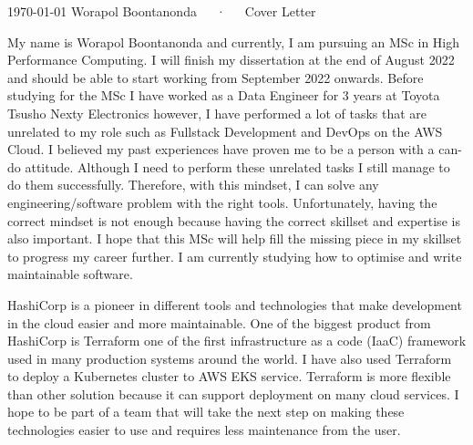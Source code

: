 \documentclass[11pt, a4paper]{awesome-cv}
\begin{document}
\makecvheader[R]

\makecvfooter
  {\today}
  {Worapol Boontanonda~~~·~~~Cover Letter}
  {}

\makelettertitle

\begin{cvletter}

My name is Worapol Boontanonda and currently, I am pursuing an MSc in High Performance Computing.
I will finish my dissertation at the end of August 2022 and should be able to start working from
September 2022 onwards.
Before studying for the MSc I have worked as a Data Engineer for 3 years at Toyota Tsusho Nexty Electronics 
however, I have performed a lot of tasks that are unrelated to my role such as Fullstack Development 
and DevOps on the AWS Cloud. I believed my past experiences have proven me to be a person 
with a can-do attitude. Although I need to perform these unrelated tasks I still manage to do them successfully. 
Therefore, with this mindset, I can solve any engineering/software problem with the right tools. 
Unfortunately, having the correct mindset is not enough 
because having the correct skillset and expertise is also important. 
I hope that this MSc will help fill the missing piece in my skillset to progress my career further. I am currently studying how to optimise and write maintainable software.


HashiCorp is a pioneer in different tools and technologies that make development in the cloud easier and more maintainable. One of the biggest product from HashiCorp is Terraform one of the first infrastructure as a code (IaaC) framework used in many production systems around the world. I have also used Terraform to deploy a Kubernetes cluster to AWS EKS service. Terraform is more flexible than other solution because it can support deployment on many cloud services. I hope to be part of a team that will take the next step on making these technologies easier to use and requires less maintenance from the user.


\end{cvletter}
\end{document}
